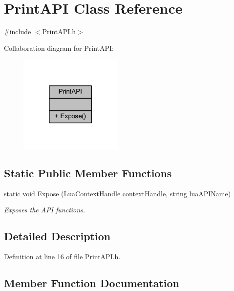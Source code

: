 \hypertarget{class_print_a_p_i}{}\section{Print\+A\+PI Class Reference}
\label{class_print_a_p_i}


{\ttfamily \#include $<$Print\+A\+P\+I.\+h$>$}



Collaboration diagram for Print\+A\+PI\+:\nopagebreak
\begin{figure}[H]
\begin{center}
\leavevmode
\includegraphics[width=145pt]{class_print_a_p_i__coll__graph}
\end{center}
\end{figure}
\subsection*{Static Public Member Functions}
\begin{DoxyCompactItemize}
\item 
static void \hyperlink{class_print_a_p_i_a2e99b93348cbb332fc7dda07616d4bad}{Expose} (\hyperlink{_lua_context_8h_a2ffcc2d3ed21165072a1d7b61259bf14}{Lua\+Context\+Handle} context\+Handle, \hyperlink{_types_8h_ad453f9f71ce1f9153fb748d6bb25e454}{string} lua\+A\+P\+I\+Name)
\begin{DoxyCompactList}\small\item\em Exposes the A\+PI functions. \end{DoxyCompactList}\end{DoxyCompactItemize}


\subsection{Detailed Description}


Definition at line 16 of file Print\+A\+P\+I.\+h.



\subsection{Member Function Documentation}
